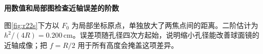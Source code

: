 \begin{solution}
\par\medskip{}\noindent\textbf{用数值和局部图检查近轴误差的阶数}\par\nobreak
图\ref{fig:r22s}下方以 \(F_0\) 为局部坐标原点，单独放大了两焦点间的距离。二阶估计为 \(h^2/(4R)=0.200\,\mathrm{cm}\)。误差项随孔径四次方起始，说明缩小孔径能改善球面镜的近轴成像；把 \(f=R/2\) 用于所有高度会掩盖这项差异。
\end{solution}
